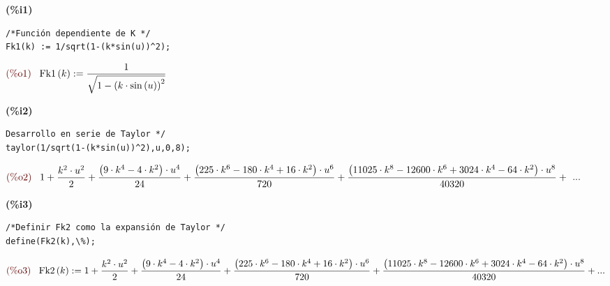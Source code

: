 \documentclass[12pt]{article}
\begin{document}
\noindent
\begin{minipage}[t]{8ex}\color{red}\bf
(\%i1) 
\end{minipage}
\begin{minipage}[t]{\textwidth}\color{blue}
\begin{verbatim}
/*Función dependiente de K */
Fk1(k) := 1/sqrt(1-(k*sin(u))^2);
\end{verbatim}
\end{minipage}
\begin{math}\displaystyle
\parbox{8ex}{\color{labelcolor}(\%o1) }
\mathrm{Fk1}\left( k\right) :=\frac{1}{\sqrt{1-{{\left( k\cdot \mathrm{sin}\left( u\right) \right) }^{2}}}}\mbox{}
\end{math}
\\
\noindent
\begin{minipage}[t]{8ex}\color{red}\bf
(\%i2) 
\end{minipage}
\begin{minipage}[t]{\textwidth}\color{blue}
\begin{verbatim}
Desarrollo en serie de Taylor */
taylor(1/sqrt(1-(k*sin(u))^2),u,0,8);
\end{verbatim}
\end{minipage}
\begin{math}
\displaystyle
\parbox{8ex}{\color{labelcolor}(\%o2) }
1+\frac{{{k}^{2}}\cdot {{u}^{2}}}{2}+\frac{\left( 9\cdot {{k}^{4}}-4\cdot {{k}^{2}}\right) \cdot {{u}^{4}}}{24}+\frac{\left( 225\cdot {{k}^{6}}-180\cdot {{k}^{4}}+16\cdot {{k}^{2}}\right) \cdot {{u}^{6}}}{720}+\frac{\left( 11025\cdot {{k}^{8}}-12600\cdot {{k}^{6}}+3024\cdot {{k}^{4}}-64\cdot {{k}^{2}}\right) \cdot {{u}^{8}}}{40320}+\mbox{}
\end{math}
\mbox{...}

\noindent
\begin{minipage}[t]{8ex}\color{red}\bf
(\%i3) 
\end{minipage}
\begin{minipage}[t]{\textwidth}\color{blue}
\begin{verbatim}
/*Definir Fk2 como la expansión de Taylor */
define(Fk2(k),\%);
\end{verbatim}
\end{minipage}
\begin{math}
\displaystyle
\parbox{8ex}{\color{labelcolor}(\%o3) }
\mathrm{Fk2}\left( k\right) :=1+\frac{{{k}^{2}}\cdot {{u}^{2}}}{2}+\frac{\left( 9\cdot {{k}^{4}}-4\cdot {{k}^{2}}\right) \cdot {{u}^{4}}}{24}+\frac{\left( 225\cdot {{k}^{6}}-180\cdot {{k}^{4}}+16\cdot {{k}^{2}}\right) \cdot {{u}^{6}}}{720}+\frac{\left( 11025\cdot {{k}^{8}}-12600\cdot {{k}^{6}}+3024\cdot {{k}^{4}}-64\cdot {{k}^{2}}\right) \cdot {{u}^{8}}}{40320}+\mbox{}
\mbox{...}
\end{math}
\end{document}
